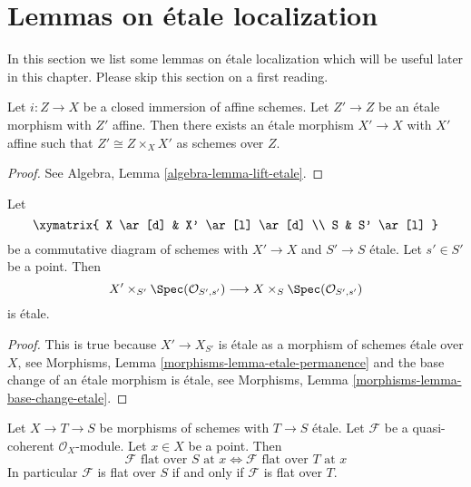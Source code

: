 \section{Lemmas on \'etale localization}
\label{section-etale-localization}

\noindent
In this section we list some lemmas on \'etale localization which will be
useful later in this chapter. Please skip this section on a first reading.

\begin{lemma}
\label{lemma-lift-etale}
Let $i : Z \to X$ be a closed immersion of affine schemes.
Let $Z' \to Z$ be an \'etale morphism with $Z'$ affine.
Then there exists an \'etale morphism $X' \to X$ with $X'$
affine such that $Z' \cong Z \times_X X'$ as schemes over $Z$.
\end{lemma}

\begin{proof}
See
Algebra, Lemma \ref{algebra-lemma-lift-etale}.
\end{proof}

\begin{lemma}
\label{lemma-etale-at-point}
Let
$$
\xymatrix{
X \ar[d] & X' \ar[l] \ar[d] \\
S & S' \ar[l]
}
$$
be a commutative diagram of schemes with $X' \to X$ and $S' \to S$ \'etale.
Let $s' \in S'$ be a point. Then
$$
X' \times_{S'} \Spec(\mathcal{O}_{S', s'})
\longrightarrow
X \times_S \Spec(\mathcal{O}_{S', s'})
$$
is \'etale.
\end{lemma}

\begin{proof}
This is true because $X' \to X_{S'}$ is \'etale as a morphism of
schemes \'etale over $X$, see
Morphisms, Lemma \ref{morphisms-lemma-etale-permanence}
and the base change of an \'etale morphism is \'etale, see
Morphisms, Lemma \ref{morphisms-lemma-base-change-etale}.
\end{proof}

\begin{lemma}
\label{lemma-etale-flat-up-down}
Let $X \to T \to S$ be morphisms of schemes with $T \to S$ \'etale.
Let $\mathcal{F}$ be a quasi-coherent $\mathcal{O}_X$-module.
Let $x \in X$ be a point. Then
$$
\mathcal{F}\text{ flat over }S\text{ at }x
\Leftrightarrow
\mathcal{F}\text{ flat over }T\text{ at }x
$$
In particular $\mathcal{F}$ is flat over $S$ if and only if $\mathcal{F}$
is flat over $T$.
\end{lemma}

